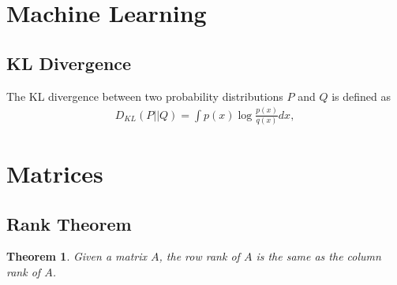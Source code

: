 \documentclass{amsart}
\newtheorem{theorem}{Theorem}
\theoremstyle{plain}
\numberwithin{equation}{section}
\begin{document}
\section{Machine Learning}
\subsection{KL Divergence}
The KL divergence between two probability distributions $P$ and $Q$ is defined as
\begin{align*}
D_{KL}(P||Q) = \int p(x) \log \frac{p(x)}{q(x)} dx,
\end{align*}
\section{Matrices}
\subsection{Rank Theorem}
\begin{theorem}
Given a matrix $A$, the row rank of $A$ is the 
same as the column rank of $A$. 
\end{theorem}
\end{document}
